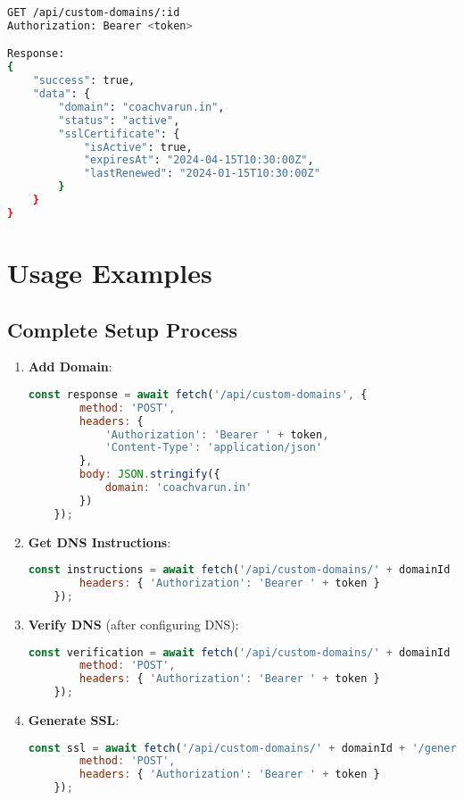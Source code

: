 \documentclass[12pt,a4paper]{article}
\begin{document}
\begin{lstlisting}[language=bash,frame=single]
GET /api/custom-domains/:id
Authorization: Bearer <token>

Response:
{
    "success": true,
    "data": {
        "domain": "coachvarun.in",
        "status": "active",
        "sslCertificate": {
            "isActive": true,
            "expiresAt": "2024-04-15T10:30:00Z",
            "lastRenewed": "2024-01-15T10:30:00Z"
        }
    }
}
\end{lstlisting}

\section{Usage Examples}

\subsection{Complete Setup Process}

\begin{enumerate}
    \item \textbf{Add Domain}:
    \begin{lstlisting}[language=javascript]
    const response = await fetch('/api/custom-domains', {
        method: 'POST',
        headers: {
            'Authorization': 'Bearer ' + token,
            'Content-Type': 'application/json'
        },
        body: JSON.stringify({
            domain: 'coachvarun.in'
        })
    });
    \end{lstlisting}
    
    \item \textbf{Get DNS Instructions}:
    \begin{lstlisting}[language=javascript]
    const instructions = await fetch('/api/custom-domains/' + domainId + '/dns-instructions', {
        headers: { 'Authorization': 'Bearer ' + token }
    });
    \end{lstlisting}
    
    \item \textbf{Verify DNS} (after configuring DNS):
    \begin{lstlisting}[language=javascript]
    const verification = await fetch('/api/custom-domains/' + domainId + '/verify-dns', {
        method: 'POST',
        headers: { 'Authorization': 'Bearer ' + token }
    });
    \end{lstlisting}
    
    \item \textbf{Generate SSL}:
    \begin{lstlisting}[language=javascript]
    const ssl = await fetch('/api/custom-domains/' + domainId + '/generate-ssl', {
        method: 'POST',
        headers: { 'Authorization': 'Bearer ' + token }
    });
    \end{lstlisting}
\end{enumerate}
\end{document}
